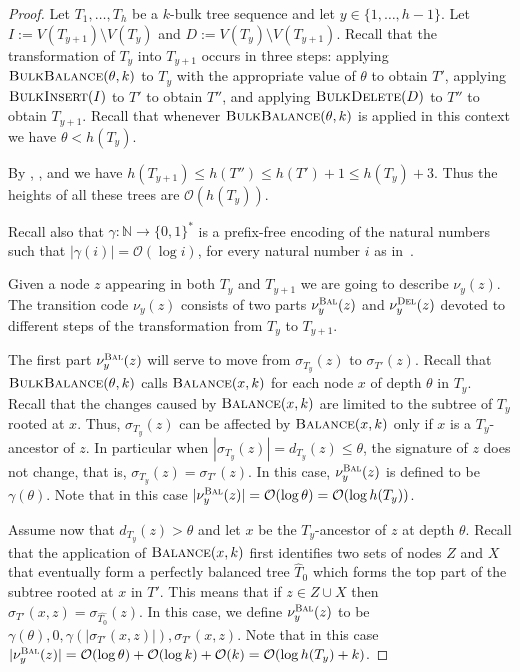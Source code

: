 \documentclass[kpfonts]{patmorin}
\newcommand{\Oh}{\mathcal{O}}
\let\leq\leqslant
\begin{document}
\begin{proof}
  Let $T_1,\ldots,T_h$ be a $k$-bulk tree sequence and let $y\in\{1,\ldots,h-1\}$. Let $I:=V(T_{y+1})\setminus V(T_y)$ and $D:=V(T_y) \setminus V(T_{y+1})$.
  Recall that the transformation of $T_{y}$ into $T_{y+1}$ occurs in three steps:
  applying $\textsc{BulkBalance}(\theta,k)$ to $T_y$ with the appropriate value of $\theta$ to obtain $T'$,
  applying $\textsc{BulkInsert}(I)$ to $T'$ to obtain $T''$, and
  applying $\textsc{BulkDelete}(D)$ to $T''$ to obtain $T_{y+1}$.
  Recall that whenever $\textsc{BulkBalance}(\theta,k)$ is applied in this context we have $\theta < h(T_y)$.

  By , , and  we have  $h(T_{y+1}) \leq h(T'') \leq h(T')+1 \leq h(T_y)+3$.
  Thus the heights of all these trees are $\Oh(h(T_y))$.

  Recall also that $\gamma:\mathbb{N}\to\{0,1\}^*$ is a prefix-free encoding of the natural numbers such that $|\gamma(i)|=\Oh(\log i)$, for every natural number $i$ as in~.

  Given a node $z$ appearing in both $T_y$ and $T_{y+1}$ we are going to describe $\nu_y(z)$.
  The transition code $\nu_y(z)$ consists of two parts $\nu_y^{\textsc{Bal}}(z)$ and $\nu_y^{\textsc{Del}}(z)$ devoted to different steps of the transformation from $T_y$ to $T_{y+1}$.

  The first part $\nu_y^{\textsc{Bal}}(z)$ will serve to move from $\sigma_{T_y}(z)$ to $\sigma_{T'}(z)$.
  Recall that $\textsc{BulkBalance}(\theta,k)$ calls $\textsc{Balance}(x,k)$ for each node $x$ of depth $\theta$  in $T_y$.
  Recall that the changes caused by $\textsc{Balance}(x,k)$ are limited to the subtree of $T_y$ rooted at $x$.
  Thus, $\sigma_{T_y}(z)$ can be affected by $\textsc{Balance}(x,k)$ only if $x$ is a $T_y$-ancestor of $z$.
  In particular when $|\sigma_{T_y}(z)| = d_{T_y}(z) \leq \theta$, the signature of $z$ does not change, that is, $\sigma_{T_y}(z)=\sigma_{T'}(z)$. In this case,  $\nu_y^{\textsc{Bal}}(z)$ is defined to be $\gamma(\theta)$.
  Note that in this case $|\nu^{\textsc{Bal}}_y(z)|=\Oh(\log\theta) = \Oh(\log h(T_y))$.

  Assume now that $d_{T_y}(z) > \theta$ and let $x$ be the $T_y$-ancestor of $z$ at depth $\theta$.
  Recall that the application of $\textsc{Balance}(x,k)$ first identifies two sets of nodes $Z$ and $X$ that eventually form a perfectly balanced tree $\hat{T}_0$ which forms the top part of the subtree rooted at $x$ in $T'$.
  This means that if $z\in Z\cup X$ then $\sigma_{T'}(x,z) =\sigma_{\hat{T_0}}(z)$.
  In this case, we define $\nu_y^{\textsc{Bal}}(z)$ to be $\gamma(\theta),0,\gamma(|\sigma_{T'}(x,z)|),\sigma_{T'}(x,z)$.
  Note that in this case $|\nu^{\textsc{Bal}}_y(z)|=\Oh(\log\theta) + \Oh(\log k) + \Oh(k) = \Oh(\log h(T_y) + k)$.


\end{proof}
\end{document}
